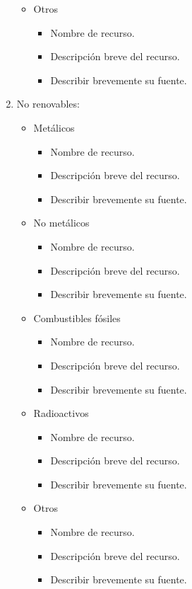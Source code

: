 \begin{enumerate}
\begin{itemize}
		\item Otros
		\begin{itemize}
			\item Nombre de recurso.
			\item Descripción breve del recurso.
			\item Describir brevemente su fuente.
		\end{itemize}
	\end{itemize}
	
	\item No renovables:
	\begin{itemize}
		\item Metálicos
		\begin{itemize}
			\item Nombre de recurso.
			\item Descripción breve del recurso.
			\item Describir brevemente su fuente.
		\end{itemize}
		
		\item No metálicos
		\begin{itemize}
			\item Nombre de recurso.
			\item Descripción breve del recurso.
			\item Describir brevemente su fuente.
		\end{itemize}
		
		\item Combustibles fósiles
		\begin{itemize}
			\item Nombre de recurso.
			\item Descripción breve del recurso.
			\item Describir brevemente su fuente.
		\end{itemize}
		
		\item Radioactivos
		\begin{itemize}
			\item Nombre de recurso.
			\item Descripción breve del recurso.
			\item Describir brevemente su fuente.
		\end{itemize}
		
		\item Otros
		\begin{itemize}
			\item Nombre de recurso.
			\item Descripción breve del recurso.
			\item Describir brevemente su fuente.
		\end{itemize}
	\end{itemize}
	

\end{enumerate}
